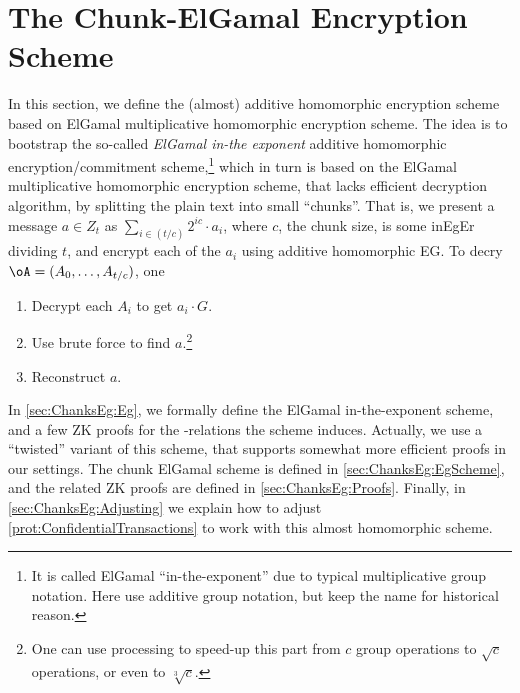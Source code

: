 \newcommand{\PedEncs}{{\sf PedEnc}}
\newcommand{\rPedEnc}{\cR_\PedEncs}

\newcommand{\rPedEncDef}
{
	\sset{((H,A),(a,r))\colon \Ped_H(a;r)= A}
}



\newcommand{\dlS}{{{\sf DL}}}
\newcommand{\rdl}{\cR_\dlS}
\newcommand{\rdlDef}
{
	\sset{(A,a))\colon A = a \cdot G}
}

\newcommand{\PedS}{{{\sf Ped}}}
\newcommand{\rPed}{\cR_\PedS}
\newcommand{\rPedDef}
{
	\sset{((H,A),(a,r)))\colon A = \Ped_H(a;r)}
}

\newcommand{\PedEqS}{{{\sf PedEq}}}
\newcommand{\rPedEq}{\cR_\PedEqS}
\newcommand{\rPedEqDef}
{
	\sset{((H,A_0,A_1),(a,r_0,r_1)))\colon \forall j \in \zo A = \Ped_H(a;r_j) = A_j}
}


\newcommand{\randomH}{\MathAlgX{RanElm}}

\section{The Chunk-ElGamal  Encryption Scheme}\label{sec:ChanksEg}
In this section, we define the  (almost) additive homomorphic encryption scheme based on ElGamal multiplicative  homomorphic encryption scheme.  
The idea is to bootstrap the so-called   \textit{ElGamal in-the exponent}   additive homomorphic encryption/commitment  scheme,\footnote{It is called ElGamal ``in-the-exponent'' due to typical multiplicative group notation. Here use additive group notation, but keep the name for historical reason.}  which in turn is based on the  ElGamal multiplicative  homomorphic encryption scheme, that lacks efficient decryption algorithm, by splitting the plain text into small ``chunks''. That  is, we present a message $a\in Z_t$ as $\sum_{i \in (t/c)}   2^{i c} \cdot a_i$, where $c$, the chunk size, is  some inEgEr  dividing $t$, and encrypt each of the $a_i$ using    additive homomorphic EG. To decry $\oA= (A_0,\ldots,A_{t/c})$, one  
\begin{enumerate}
	\item Decrypt   each $A_i$ to get $a_i  \cdot G$.
	\item Use brute force to find $a$.\footnote{One can use    processing to speed-up this part from $c$ group operations to $\sqrt{c}$  operations, or even  to   $\sqrt[3]{c}$.}
	
	\item Reconstruct $a$.
\end{enumerate}
In \cref{sec:ChanksEg:Eg}, we formally define the  ElGamal in-the-exponent scheme, and a few ZK proofs for the \NP-relations the scheme induces. Actually, we use a ``twisted'' variant of this scheme, that supports somewhat more efficient proofs in our settings.   The chunk ElGamal  scheme is defined in \cref{sec:ChanksEg:EgScheme}, and the related ZK proofs are defined in \cref{sec:ChanksEg:Proofs}. Finally, in \cref{sec:ChanksEg:Adjusting} we explain  how to adjust \cref{prot:ConfidentialTransactions} to work with this almost homomorphic scheme.




